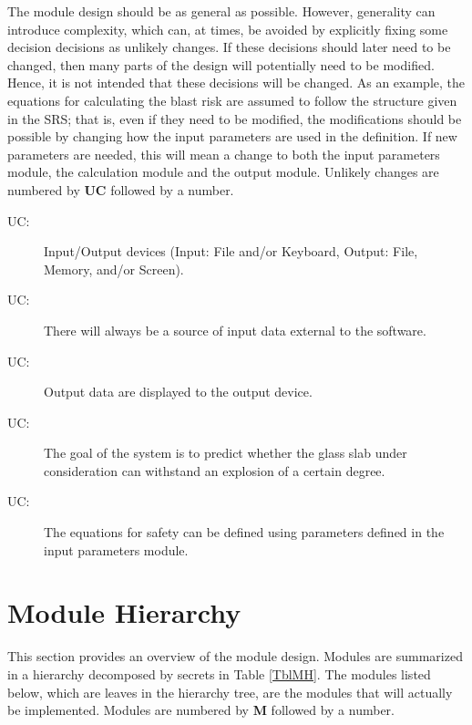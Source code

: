 \documentclass[12pt]{article}
\newcounter{ucnum}
\newcommand{\uctheucnum}{UC\theucnum}
\begin{document}
The module design should be as general as possible. However, generality can introduce complexity, which can, at times, be avoided by explicitly fixing some decision decisions as unlikely changes. If
these decisions should later need to be changed, then many parts of the design
will potentially need to be modified. Hence, it is not intended that these
decisions will be changed.  As an example, the equations for calculating the 
blast risk  are assumed to follow the structure given in the SRS; that is,
even if they need to be modified, the modifications should be possible by
changing how the input parameters are used in the definition.  If new parameters
are needed, this will mean a change to both the input parameters module, the
calculation module and the output module.
 Unlikely changes are numbered by \textbf{UC}
followed by a number.

\begin{description}
\item[ \uctheucnum \label{ucIO}:] Input/Output devices
  (Input: File and/or Keyboard, Output: File, Memory, and/or Screen).
\item[ \uctheucnum \label{ucInput}:] There will always be
  a source of input data external to the software.
\item[ \uctheucnum \label{ucOutput}:] Output data are
  displayed to the output device.
\item[ \uctheucnum \label{ucGoal}:] The goal of the system
  is to predict whether the glass slab under consideration can withstand an 
  explosion of a certain degree.
\item[ \uctheucnum \label{ucODEstructure}:] The 
equations for safety can be defined using parameters defined in the input parameters 
module.

\end{description}

\section{Module Hierarchy} \label{SecMH}


This section provides an overview of the module design. Modules are summarized
in a hierarchy decomposed by secrets in Table \ref{TblMH}. The modules listed
below, which are leaves in the hierarchy tree, are the modules that will
actually be implemented.  Modules are numbered by \textbf{M}
followed by a number.
\end{document}
